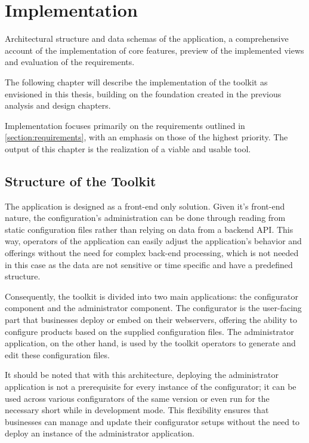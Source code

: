 \chapter{Implementation}

\begin{chapterabstract}
    Architectural structure and data schemas of the application, a comprehensive account of the implementation of core features, preview of the implemented views and evaluation of the requirements.
\end{chapterabstract}

The following chapter will describe the implementation of the toolkit as envisioned in this thesis, building on the foundation created in the previous analysis and design chapters. 

Implementation focuses primarily on the requirements outlined in \autoref{section:requirements}, with an emphasis on those of the highest priority. The output of this chapter is the realization of a viable and usable tool.

\section{Structure of the Toolkit}

The application is designed as a front-end only solution. Given it's front-end nature, the configuration's administration can be done through reading from static configuration files rather than relying on data from a backend API. This way, operators of the application can easily adjust the application's behavior and offerings without the need for complex back-end processing, which is not needed in this case as the data are not sensitive or time specific and have a predefined structure. 

Consequently, the toolkit is divided into two main applications: the configurator component and the administrator component. The configurator is the user-facing part that businesses deploy or embed on their webservers, offering the ability to configure products based on the supplied configuration files. The administrator application, on the other hand, is used by the toolkit operators to generate and edit these configuration files.

It should be noted that with this architecture, deploying the administrator application is not a prerequisite for every instance of the configurator; it can be used across various configurators of the same version or even run for the necessary short while in development mode. This flexibility ensures that businesses can manage and update their configurator setups without the need to deploy an instance of the administrator application.

